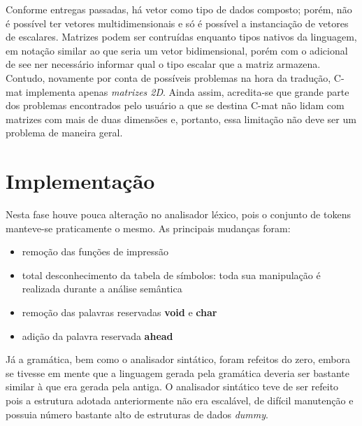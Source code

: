 \documentclass[
	article,			%
	11pt,				%
	oneside,			%
	a4paper,			%
	english,			%
	brazil,				%
	sumario=tradicional
	]{abntex2}
\renewcommand{\it}[1]{\textit{#1}}
\renewcommand{\bf}[1]{\textbf{#1}}
\begin{document}
Conforme entregas passadas, há vetor como tipo de dados composto; porém, não é possível ter vetores multidimensionais e só é possível a instanciação de vetores de escalares. Matrizes podem ser contruídas
enquanto tipos nativos da linguagem, em notação similar ao que seria um vetor bidimensional, porém com o
adicional de see ner necessário informar qual o tipo escalar que a matriz armazena. Contudo, novamente por conta de
possíveis problemas na hora da tradução, C-mat implementa apenas \it{matrizes 2D}. Ainda assim,
acredita-se que grande parte dos problemas encontrados pelo usuário a que se destina C-mat não lidam com
matrizes com mais de duas dimensões e, portanto, essa limitação não deve ser um problema de maneira
geral.

\section{Implementação}
\label{implementacao}

Nesta fase houve pouca alteração no analisador léxico, pois o conjunto de tokens manteve-se praticamente o mesmo. As principais mudanças foram:
\begin{itemize}
	\item remoção das funções de impressão
	\item total desconhecimento da tabela de símbolos: toda sua manipulação é realizada durante a análise semântica
	\item remoção das palavras reservadas \bf{void} e \bf{char}
	\item adição da palavra reservada \bf{ahead}
\end{itemize}

Já a gramática, bem como o analisador sintático, foram refeitos do zero, 
embora se tivesse em mente que a linguagem gerada pela gramática deveria ser bastante similar à que era gerada pela antiga. O analisador sintático teve de ser refeito pois a estrutura adotada 
anteriormente não era escalável, de difícil manutenção e possuia número bastante alto de estruturas de dados \it{dummy}.
\end{document}
